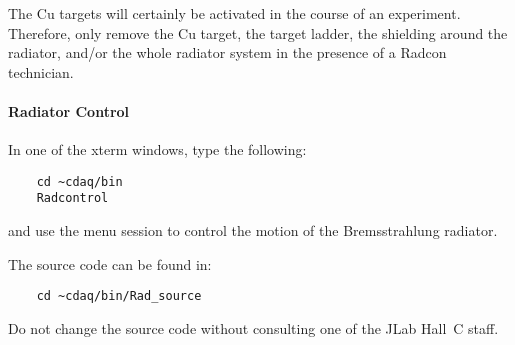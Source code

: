 The Cu targets will certainly be activated in the course of an experiment.
Therefore, only remove
the Cu target, the target ladder, the shielding around the radiator,
and/or the whole radiator system in the presence of a Radcon technician.

\paragraph{Radiator Control}

In one of the xterm windows, type the following:

\begin{verbatim}
	cd ~cdaq/bin
	Radcontrol
\end{verbatim}

and use the menu session to control the motion of the
Bremsstrahlung radiator.

The source code can be found in:

\begin{verbatim}
	cd ~cdaq/bin/Rad_source
\end{verbatim}

Do not change the source code without consulting
one of the JLab Hall~C staff.
